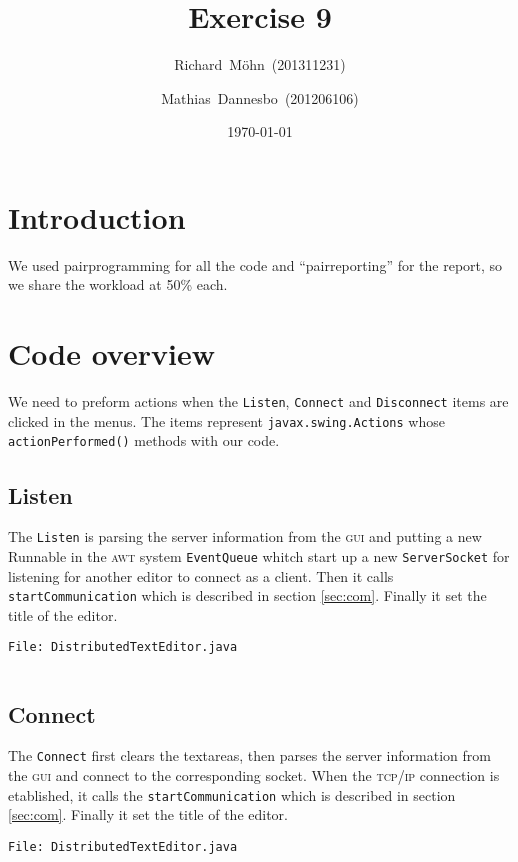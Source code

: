\documentclass[a4paper,draft,12pt,oneside,article,table]{memoir}
\newcommand{\supertitle}[1]{\gdef\suP{#1}}
\newcommand{\subtitle}[1]{\gdef\suB{#1}}
\newcommand{\stunum}[1]{\gdef\stuN{#1}}
\newcommand{\srcpath}{../ex09/src/main/java/ddist}
\newcommand{\inmnt}[3]{\vspace{1em}\noindent\texttt{\color{gray}File: #3}\vspace{-1em}\inputminted[tabsize=4,firstline=#1,firstnumber=#1,lastline=#2,linenos]{java}{\srcpath/#3}}
\newcommand{\mil}[1]{\texttt{#1}}
\begin{document}
\supertitle{Distributed Systems}
\title{Exercise 9}
\author{Richard~Möhn~\small{(201311231)} \and Mathias~Dannesbo~\small{(201206106)}}
\date{\today}
\maketitle

\chapter{Introduction}
We used pairprogramming for all the code and ``pairreporting'' for the report, so we share the workload at 50\% each.

\chapter{Code overview}
We need to preform actions when the \mil{Listen}, \mil{Connect} and \mil{Disconnect} items are clicked in the menus. The items represent \mil{javax.swing.Actions} whose \mil{actionPerformed()} methods with our code.

\section{Listen}

The \mil{Listen} is parsing the server information from the \textsc{gui} and putting a new Runnable in the \textsc{awt} system \mil{EventQueue} whitch start up a new \mil{ServerSocket} for listening for another editor to connect as a client. Then it calls \mil{startCommunication} which is described in section \ref{sec:com}. Finally it set the title of the editor.

\inmnt{139}{193}{DistributedTextEditor.java}

\section{Connect}
The \mil{Connect} first clears the textareas, then parses the server information from the \textsc{gui} and connect to the corresponding socket. When the \textsc{tcp/ip} connection is etablished, it calls the \mil{startCommunication} which is described in section \ref{sec:com}. Finally it set the title of the editor.

\inmnt{195}{228}{DistributedTextEditor.java}
\end{document}
